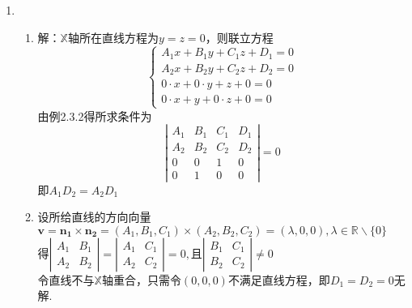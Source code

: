 \documentclass[UTF8]{ctexart}
\begin{document}
\begin{enumerate}
\item \begin{enumerate}[(1)]
\item 解：$\mathbb{X}$轴所在直线方程为$y=z=0$，则联立方程$$\left\{\begin{array}{l}A_1x+B_1y+C_1z+D_1=0\\A_2x+B_2y+C_2z+D_2=0\\0\cdot x+0\cdot y+z+0=0\\0\cdot x+y+0\cdot z+0=0\end{array}\right.$$由例2.3.2得所求条件为$$\left|\begin{array}{cccc}A_1&B_1&C_1&D_1\\A_2&B_2&C_2&D_2\\0&0&1&0\\0&1&0&0\end{array}\right|=0$$即$A_1D_2=A_2D_1$
\item 设所给直线的方向向量$\mathbf{v}=\mathbf{n_1}\times\mathbf{n_2}=\left(A_1,B_1,C_1\right)\times\left(A_2,B_2,C_2\right)=\left(\lambda,0,0\right),\lambda\in\mathbb{R}\backslash\{0\}$\\
得$\left|\begin{array}{cc}A_1&B_1\\A_2&B_2\end{array}\right|=\left|\begin{array}{cc}A_1&C_1\\A_2&C_2\end{array}\right|=0,$且$\left|\begin{array}{cc}B_1&C_1\\B_2&C_2\end{array}\right|\neq0$\\
令直线不与$\mathbb{X}$轴重合，只需令$\left(0,0,0\right)$不满足直线方程，即$D_1=D_2=0$无解.\\

\end{enumerate}
\end{enumerate}
\end{document}
